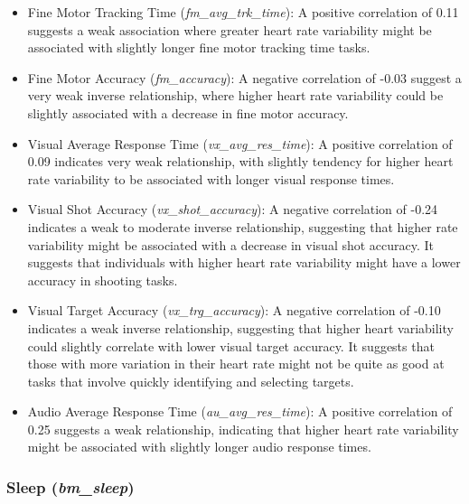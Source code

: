 \begin{itemize}
    \item Fine Motor Tracking Time (\textit{fm\_avg\_trk\_time}): A positive correlation of 0.11 suggests a weak association where greater heart rate variability
          might be associated with slightly longer fine motor tracking time tasks.

    \item Fine Motor Accuracy (\textit{fm\_accuracy}): A negative correlation of -0.03 suggest a very weak inverse relationship, where higher heart rate variability
          could be slightly associated with a decrease in fine motor accuracy.

    \item Visual Average Response Time (\textit{vx\_avg\_res\_time}): A positive correlation of 0.09 indicates very weak relationship, with slightly tendency for
          higher heart rate variability to be associated with longer visual response times.

    \item Visual Shot Accuracy (\textit{vx\_shot\_accuracy}): A negative correlation of -0.24 indicates a weak to moderate inverse relationship, suggesting that
          higher rate variability might be associated with a decrease in visual shot accuracy. It suggests that individuals with higher heart rate variability might
          have a lower accuracy in shooting tasks.

    \item Visual Target Accuracy (\textit{vx\_trg\_accuracy}): A negative correlation of -0.10 indicates a weak inverse relationship, suggesting that higher heart
          variability could slightly correlate with lower visual target accuracy. It suggests that those with more variation in their heart rate might not be quite as good
          at tasks that involve quickly identifying and selecting targets.

    \item Audio Average Response Time (\textit{au\_avg\_res\_time}): A positive correlation of 0.25 suggests a weak relationship, indicating that higher heart rate
          variability might be associated with slightly longer audio response times.

\end{itemize}


\subsubsection*{Sleep (\textit{bm\_sleep})}

